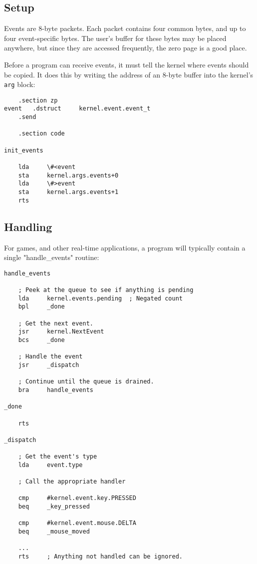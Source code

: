 \subsection*{Setup}
Events are 8-byte packets.  Each packet contains four common bytes, and up to four event-specific bytes.  The user's buffer for these bytes may be placed anywhere, but since they are accessed frequently, the zero page is a good place.

Before a program can receive events, it must tell the kernel where events should be copied.  It does this by writing the address of an 8-byte buffer into the kernel's \verb+arg+ block:

\begin{verbatim}
    .section zp
event   .dstruct	 kernel.event.event_t
    .send

    .section code

init_events

    lda     \#<event
    sta     kernel.args.events+0
    lda     \#>event
    sta     kernel.args.events+1
    rts
\end{verbatim}

\subsection*{Handling}
For games, and other real-time applications, a program will typically contain a single "handle\_events" routine:

\begin{verbatim}
handle_events

    ; Peek at the queue to see if anything is pending
    lda		kernel.events.pending  ; Negated count
    bpl		_done

    ; Get the next event.
    jsr		kernel.NextEvent
    bcs		_done

    ; Handle the event
    jsr		_dispatch
            
    ; Continue until the queue is drained.
    bra		handle_events
            
_done

    rts

_dispatch

    ; Get the event's type
    lda		event.type
    					
    ; Call the appropriate handler

    cmp		#kernel.event.key.PRESSED
    beq		_key_pressed

    cmp		#kernel.event.mouse.DELTA
    beq		_mouse_moved
			
    ...
    rts     ; Anything not handled can be ignored.
\end{verbatim}

